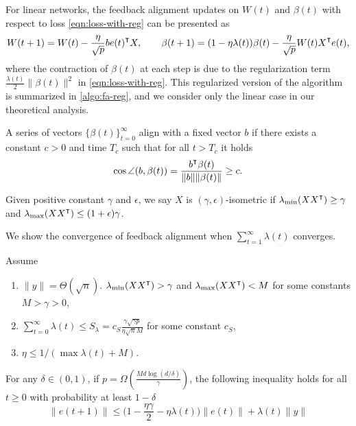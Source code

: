 For linear networks, the feedback alignment updates on $W(t)$ and $\beta(t)$ with respect to loss \eqref{eqn:loss-with-reg} can be presented as
\begin{align}\label{eqn:update-reg}
    W(t+1) = W(t) - \frac{\eta}{\sqrt p}b e(t)\transpose X, \qquad \beta(t+1) = (1-\eta\lambda(t))\beta(t) - \frac{\eta}{\sqrt p} W(t)X\transpose e(t), 
\end{align}
where the contraction of $\beta(t)$ at each step is due to the regularization term $\frac{\lambda(t)}{2}\|\beta(t)\|^2$ in \eqref{eqn:loss-with-reg}. This regularized version of the algorithm is summarized in \cref{algo:fa-reg}, and we consider only the linear case in our theoretical analysis.

\begin{definition}\label{def:alignment}
    A series of vectors $\{\beta(t)\}_{t=0}^\infty$ align with a fixed vector $b$ if there exists a constant $c>0$ and time $T_c$ such that for all $t > T_c$ it holds
    \begin{align*}
        \cos\angle(b, \beta(t)) = \frac{b\transpose \beta(t)}{\|b\|\|\beta(t)\|} \geq c.
    \end{align*}
\end{definition}

\begin{definition}
Given positive constant $\gamma$ and $\epsilon$, we say $X$ is $(\gamma, \epsilon)$-isometric if 
$\lambda_{\min}(XX\transpose)\geq\gamma$ and $\lambda_{\max}(XX\transpose)\leq(1+\epsilon)\gamma$.
\end{definition}

We show the convergence of feedback alignment when $\sum_{t=1}^\infty \lambda(t)$ converges. 
\begin{theorem}
\label{thm:lin_conv}
Assume
\begin{enumerate}
\item $\|y\| = \Theta(\sqrt n)$. $\lambda_{\min}(XX\transpose)>\gamma$ and $\lambda_{\max}(XX\transpose)<M$ for some constants $M>\gamma>0$,
\item $\sum_{t=0}^\infty \lambda(t) \leq  S_\lambda = c_{S}\frac{\gamma\sqrt{\gamma p}}{\eta\sqrt{n}M}$ for some constant $c_{S}$,
\item $\eta \leq 1/(\max \lambda(t)+M)$.
\end{enumerate}
For any $\delta\in(0,1)$, if $p = \Omega(\frac{Md\log(d/\delta)}{\gamma})$, the following inequality holds for all $t\geq 0$ with probability at least $1-\delta$
\begin{equation}
\label{eq:reg_error_bd}
\|e(t+1)\|\leq \big(1-\frac{\eta\gamma}{2}-\eta\lambda(t)\big)\|e(t)\| + \lambda(t)\|y\|
\end{equation} 
\end{theorem}

